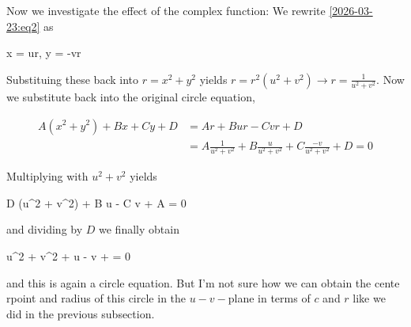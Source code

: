 Now we investigate the effect of the complex function: We rewrite \eqref{2026-03-23:eq2} as

\bee
x = ur, \quad y = -vr
\eee

Substituing these back into $r = x^2 + y^2$ yields $r = r^2 (u^2 + v^2) \rightarrow r = \frac{1}{u^2 + v^2}$. Now we substitute back into the original circle equation,

\begin{align*}
A(x^2 + y^2) + Bx + Cy + D &= A r + B ur - C vr  + D \\ 
&= A \frac{1}{u^2 + v^2} + B \frac{u}{u^2 + v^2} +C \frac{-v}{u^2 + v^2} + D = 0    
\end{align*}

Multiplying with $u^2 + v^2$ yields

\bee
D (u^2 + v^2) + B u - C v + A = 0
\eee

and dividing by $D$ we finally obtain

\bee
u^2 + v^2 +  u -  v +  = 0
\eee

and this is again a circle equation. But I'm not sure how we can obtain the cente rpoint and radius of this circle in the $u-v-$plane in terms of $c$ and $r$ like we did in the previous subsection.




